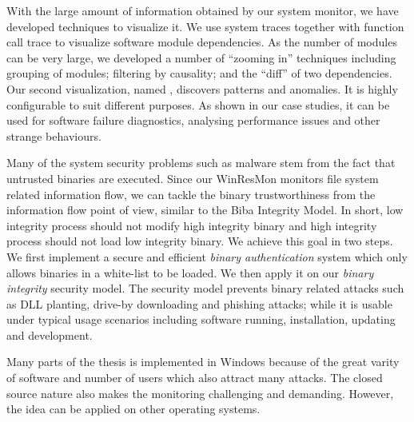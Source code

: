 With the large amount of information obtained by our system monitor,
we have developed techniques to visualize it.
We use system traces together with function call trace to visualize
software module dependencies.
As the number of modules can be very large,
we developed a number of ``zooming in'' techniques including
grouping of modules; filtering by causality;
and the ``diff'' of two dependencies.
Our second visualization, named , discovers patterns and anomalies.
It is highly configurable to suit different purposes.
As shown in our case studies,
it can be used for software failure diagnostics,
analysing performance issues and other strange behaviours.

Many of the system security problems such as malware stem from the fact that
untrusted binaries are executed.
Since our WinResMon monitors file system related information flow,
we can tackle the binary trustworthiness from the information
flow point of view, similar to the Biba Integrity Model.
In short, low integrity process should not modify high integrity binary and
high integrity process should not load low integrity binary.
We achieve this goal in two steps.
We first implement a secure and efficient {\em binary authentication} system
which only allows binaries in a white-list to be loaded.
We then apply it on our {\em binary integrity} security model.
The security model prevents binary related attacks such as DLL planting,
drive-by downloading and phishing attacks;
while it is usable under typical usage scenarios including
software running, installation, updating and development.

Many parts of the thesis is implemented in Windows because of the great
varity of software and number of users which also attract many attacks.
The closed source nature also makes the monitoring challenging and
demanding.
However, the idea can be applied on other operating systems.
